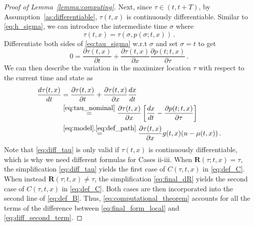 \documentclass[10pt,conference]{ieeeconf}
\renewcommand{\(}{\left(}
\renewcommand{\)}{\right)}
\renewcommand{\[}{\left[}
\renewcommand{\]}{\right]}
\newcommand{\regularversion}[1]{\iffalse{}#1\fi}
\newcommand{\extendedversion}[1]{{\color{black}#1}}
\begin{document}
\begin{proof}[Proof of Lemma~\ref{lemma:computing}]
Next, since $\tau \in (t,t+T)$, by Assumption~\ref{as:differentiable}, $\tau(t,x)$ is continuously differentiable. Similar to \eqref{eq:h_sigma}, we can introduce the intermediate time $\sigma$ where
\begin{equation}
    \tau(t,x) = \tau(\sigma,p(\sigma;t,x)) \,. \label{eq:tau_sigma}
\end{equation}
Differentiate both sides of \eqref{eq:tau_sigma} w.r.t $\sigma$ and set $\sigma = t$ \regularversion{similar to \eqref{eq:h_sigma}-\eqref{eq:final_form_local}, and then simplify \cite{extended_version}} to get
\extendedversion{\begin{equation}
    0 = \frac{\partial \tau(t,x)}{\partial t} + \frac{\partial \tau(t,x)}{\partial x}\frac{\partial p(t;t,x)}{\partial \tau} \,. \label{eq:tau_nominal}
\end{equation}
We can then describe the variation in the maximizer location $\tau$ with respect to the current time and state as
\begin{align}
    \frac{d\tau(t,x)}{dt} &= \frac{\partial \tau(t,x)}{\partial t} + \frac{\partial \tau(t,x)}{\partial x}\frac{dx}{dt} \nonumber \\
    &\overset{\eqref{eq:tau_nominal}}{=} \frac{\partial \tau(t,x)}{\partial x}\left[ \frac{dx}{dt} - \frac{\partial p(t;t,x)}{\partial \tau} \right] \nonumber \\ 
    &\overset{\eqref{eq:model},\eqref{eq:def_path}}{=} \frac{\partial \tau(t,x)}{\partial x}g(t,x)(u - \mu(t,x)) \,. \label{eq:diff_tau}
\end{align}}%
\regularversion{\begin{equation}
    \frac{d\tau(t,x)}{dt} = \frac{\partial \tau(t,x)}{\partial x}g(t,x)(u - \mu(t,x)) \,. \label{eq:diff_tau}
\end{equation}}%
Note that \eqref{eq:diff_tau} is only valid if $\tau(t,x)$ is continuously differentiable, which is why we need different formulas for Cases ii-iii.
When $\boldsymbol{R}(\tau;t,x) = \tau$, the simplification \eqref{eq:diff_tau} yields the first case of $C(\tau,t,x)$ in \eqref{eq:def_C}. When instead $\boldsymbol{R}(\tau;t,x) \neq \tau$, the simplification \eqref{eq:final_dR} yields the second case of $C(\tau,t,x)$ in \eqref{eq:def_C}. Both cases are then incorporated into the second line of \eqref{eq:def_B}. Thus, \eqref{eq:computational_theorem} accounts for all the terms of the difference between \eqref{eq:final_form_local} and \eqref{eq:diff_second_term}.


\end{proof}
\end{document}
